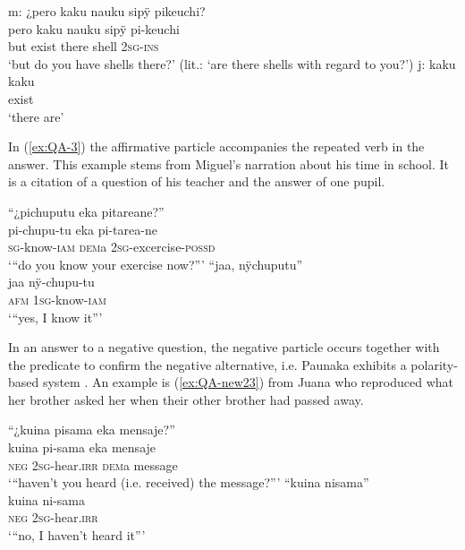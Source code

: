 \ea\label{ex:QA-1}
  \ea
\begingl
\glpreamble \textup{m:} ¿pero kaku nauku sipÿ pikeuchi?\\
\gla pero kaku nauku sipÿ pi-keuchi\\
\glb but exist there shell 2\textsc{sg}-\textsc{ins}\\
\glft ‘but do you have shells there?’ (lit.: ‘are there shells with regard to you?’)
\endgl
  \ex
\begingl
\glpreamble \textup{j:} kaku\\
\gla kaku\\
\glb exist\\
\glft ‘there are’
\endgl
\trailingcitation{[jmx-d110918ls-1.098-099]}
\z
\xe

In (\ref{ex:QA-3}) the affirmative particle accompanies the repeated verb in the answer. This example stems from Miguel’s narration about his time in school. It is a citation of a question of his teacher and the answer of one pupil.

\ea\label{ex:QA-3}
  \ea
\begingl
\glpreamble “¿pichuputu eka pitareane?”\\
\gla pi-chupu-tu eka pi-tarea-ne\\
\textsc{sg}-know-\textsc{iam} \textsc{dem}a 2\textsc{sg}-excercise-\textsc{possd}\\
\glft ‘“do you know your exercise now?”'
\endgl
  \ex
\begingl
\glpreamble “jaa, nÿchuputu”\\
\gla jaa nÿ-chupu-tu\\
\glb \textsc{afm} 1\textsc{sg}-know-\textsc{iam}\\
\glft ‘“yes, I know it”’
\endgl
\trailingcitation{[mxx-p181027l-1.047]}
\z
\xe

In an answer to a negative question, the negative particle occurs together with the predicate to confirm the negative alternative, i.e. Paunaka exhibits a polarity-based system \citep[cf.][140]{Holmberg2016}. An example is (\ref{ex:QA-new23}) from Juana who reproduced what her brother asked her when their other brother had passed away.

\ea\label{ex:QA-new23}
  \ea
\begingl
\glpreamble “¿kuina pisama eka mensaje?”\\
\gla kuina pi-sama eka mensaje\\
\glb \textsc{neg} 2\textsc{sg}-hear.\textsc{irr} \textsc{dem}a message\\
\glft ‘“haven’t you heard (i.e. received) the message?”'
\endgl
  \ex
\begingl
\glpreamble “kuina nisama”\\
\gla kuina ni-sama\\
\glb \textsc{neg} 2\textsc{sg}-hear.\textsc{irr}\\
\glft ‘“no, I haven’t heard it”’
\endgl
\trailingcitation{[jxx-p120430l-2.266-267]}
\z
\xe

